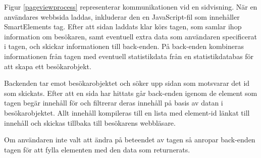 Figur \ref{pageviewprocess} representerar kommunikationen vid en sidvisning. När en användares webbsida laddas, inkluderar den en JavaScript-fil som innehåller SmartElements tag. Efter att sidan laddats klar körs tagen, som samlar ihop information om besökaren, samt eventuell extra data som användaren specificerat i tagen, och skickar informationen till back-enden. På back-enden kombineras informationen från tagen med eventuell statistikdata från en statistikdatabas för att skapa ett besökarobjekt.

Backenden tar emot besökarobjektet och söker upp sidan som motsvarar det id som skickats. Efter att en sida har hittats går back-enden igenom de element som tagen begär innehåll för och filtrerar deras innehåll på basis av datan i besökarobjektet. Allt innehåll kompileras till en lista med element-id länkat till innehåll och skickas tillbaka till besökarens webbläsare.

Om användaren inte valt att ändra på beteendet av tagen så anropar back-enden tagen för att fylla elementen med den data som returnerats.

